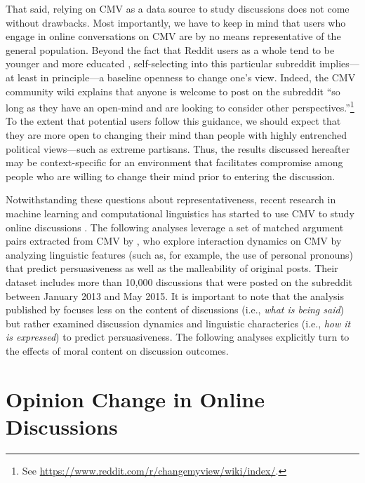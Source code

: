That said, relying on CMV as a data source to study discussions does not come without drawbacks. Most importantly, we have to keep in mind that users who engage in online conversations on CMV are by no means representative of the general population. Beyond the fact that Reddit users as a whole tend to be younger and more educated \citep{shatz2017fast}, self-selecting into this particular subreddit implies---at least in principle---a baseline openness to change one's view. Indeed, the CMV community wiki explains that anyone is welcome to post on the subreddit ``so long as they have an open-mind and are looking to consider other perspectives.''\footnote{See \url{https://www.reddit.com/r/changemyview/wiki/index/}.} To the extent that potential users follow this guidance, we should expect that they are more open to changing their mind than people with highly entrenched political views---such as extreme partisans. Thus, the results discussed hereafter may be context-specific for an environment that facilitates compromise among people who are willing to change their mind prior to entering the discussion.

Notwithstanding these questions about representativeness, recent research in machine learning and computational linguistics has started to use CMV to study online discussions \citep{wei2016post,hidey2017analyzing}. The following analyses leverage a set of matched argument pairs extracted from CMV by \citet{tan2016winning}, who explore interaction dynamics on CMV by analyzing linguistic features (such as, for example, the use of personal pronouns) that predict persuasiveness as well as the malleability of original posts. Their dataset includes more than 10,000 discussions that were posted on the subreddit between January 2013 and May 2015. It is important to note that the analysis published by \citet{tan2016winning} focuses less on the content of discussions (i.e., \textit{what is being said}) but rather examined discussion dynamics and linguistic characterics (i.e., \textit{how it is expressed}) to predict persuasiveness. The following analyses explicitly turn to the effects of moral content on discussion outcomes.




\section{Opinion Change in Online Discussions}

